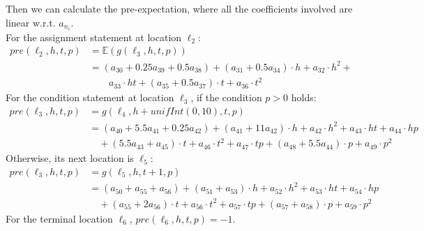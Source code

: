 \documentclass[runningheads]{llncs}
\begin{document}
Then we can calculate the pre-expectation, where all the coefficients involved are linear w.r.t. $a_{n_i}$.\\ For the assignment statement at location $\ell_2$:
\begin{align*}
pre(\ell_2,h,t,p)&=\mathbb{E}(g(\ell_3,h,t,p)) \\
&= (a_{30}+0.25a_{39}+0.5a_{38})+(a_{31}+0.5a_{34})\cdot h+a_{32}\cdot h^{2}+\\&\qquad a_{33}\cdot ht+(a_{35}+0.5a_{37})\cdot t+a_{36}\cdot t^{2}  
\end{align*}
For the condition statement at location $\ell_3$, if the condition $p>0$ holds:
\begin{align*}
pre(\!\ell_3,h,t,p\!)&\!=\!g(\ell_4,h+unifInt(0,10),t,p) \\
&\!=\!(a_{40}\!+\!5.5a_{41}\!+\!0.25a_{42})\!+\!(a_{41}\!+\!11a_{42})\!\cdot\! h\!+\!a_{42}\!\cdot\! h^{2}\!+\!a_{43}\!\cdot\!ht\!+\!a_{44}\!\cdot\! hp\\&\quad +(5.5a_{43}\!+\!a_{45})\!\cdot\! t\!+\! a_{46}\!\cdot\! t^{2}\!+\!a_{47}\!\cdot\! tp +(a_{48}\!+\!5.5a_{44})\!\cdot\! p\!+\!a_{49}\!\cdot\! p^{2} 
\end{align*}
Otherwise, its next location is $\ell_5$:
\begin{align*}
pre(\ell_3,h,t,p)&=g(\ell_5,h,t+1,p) \\
&=(a_{50}\!+\!a_{55}\!+\!a_{56})+(a_{51}\!+\!a_{53})\cdot h +a_{52}\cdot h^{2}+a_{53}\cdot ht+a_{54}\cdot hp\\&\quad +(a_{55}+2a_{56})\cdot t+a_{56}\cdot t^{2}+a_{57}\cdot tp+(a_{57}+a_{58})\cdot p+a_{59}\cdot p^{2}
\end{align*}
For the terminal location $\ell_6$, $pre(\ell_6,h,t,p)=-1$.
\end{document}
